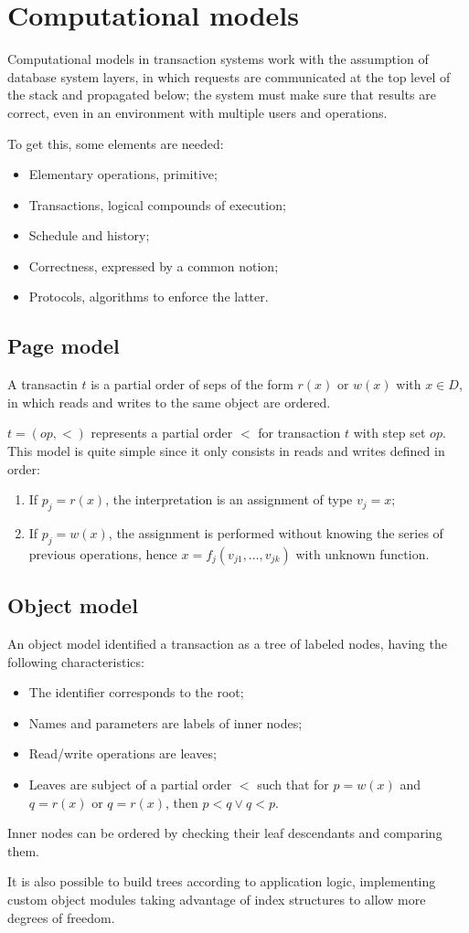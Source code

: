 
\section{Computational models}
Computational models in transaction systems work with the assumption of database system layers, in which requests are communicated at the top level of the stack and propagated below; the system must make sure that results are correct, even in an environment with multiple users and operations.

To get this, some elements are needed:
\begin{itemize}
	\item Elementary operations, primitive;
	\item Transactions, logical compounds of execution;
	\item Schedule and history;
	\item Correctness, expressed by a common notion;
	\item Protocols, algorithms to enforce the latter.
\end{itemize}

\subsection{Page model}
A transactin $t$ is a partial order of seps of the form $r(x)$ or $w(x)$ with $x \in D$, in which reads and writes to the same object are ordered. 

$t = (op, <)$ represents a partial order $<$ for transaction $t$ with step set $op$. This model is quite simple since it only consists in reads and writes defined in order:
\begin{enumerate}
	\item If $p_j = r(x)$, the interpretation is an assignment of type $v_j = x$;
	\item If $p_j = w(x)$, the assignment is performed without knowing the series of previous operations, hence $x = f_j(v_{j1}, \dots, v_{jk})$ with unknown function.
\end{enumerate}

\subsection{Object model}
An object model identified a transaction as a tree of labeled nodes, having the following characteristics:
\begin{itemize}
	\item The identifier corresponds to the root;
	\item Names and parameters are labels of inner nodes;
	\item Read/write operations are leaves;
	\item Leaves are subject of a partial order $<$ such that for $p = w(x)$ and $q = r(x)$ or $q = r(x)$, then $p < q \lor q < p$.
\end{itemize}
Inner nodes can be ordered by checking their leaf descendants and comparing them. 

It is also possible to build trees according to application logic, implementing custom object modules taking advantage of index structures to allow more degrees of freedom.



